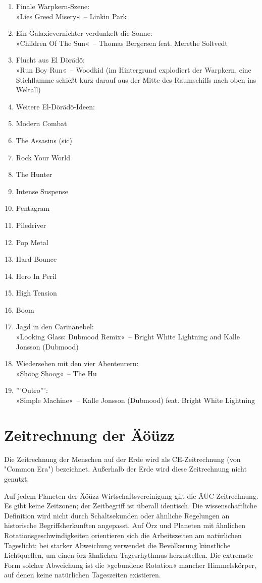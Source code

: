 \begin{enumerate}
    \item Finale Warpkern-Szene:\\ »Lies Greed Misery«~– Linkin Park
    \item Ein Galaxievernichter verdunkelt die Sonne:\\ »Children Of The Sun«~– Thomas Bergersen feat. Merethe Soltvedt
    \item Flucht aus El Dörädö:\\ »Run Boy Run«~– Woodkid                                      (im Hintergrund explodiert der Warpkern, eine Stichflamme schießt kurz darauf aus der Mitte des Raumschiffs nach oben ins Weltall)
    \item Weitere El-Dörädö-Ideen:
    \item Modern Combat
    \item The Assasins (sic)
    \item Rock Your World
    \item The Hunter
    \item Intense Suspense
    \item Pentagram
    \item Piledriver
    \item Pop Metal
    \item Hard Bounce
    \item Hero In Peril
    \item High Tension
    \item Boom
    \item Jagd in den Carinanebel:\\ »Looking Glass: Dubmood Remix«~– Bright White Lightning and Kalle Jonsson (Dubmood)
    \item Wiedersehen mit den vier Abenteurern:\\ »Shoog Shoog«~– The Hu
    \item '''Outro''':\\ »Simple Machine«~– Kalle Jonsson (Dubmood) feat. Bright White Lightning
\end{enumerate}

\chapter{Zeitrechnung der Äöüzz}

Die Zeitrechnung der Menschen auf der Erde wird als CE-Zeitrechnung (von "Common Era") bezeichnet. Außerhalb der Erde wird diese Zeitrechnung nicht genutzt.

Auf jedem Planeten der Äöüzz-Wirtschaftsvereinigung gilt die ÄÜC-Zeitrechnung. Es gibt keine Zeitzonen; der Zeitbegriff ist überall identisch. Die wissenschaftliche Definition wird nicht durch Schaltsekunden oder ähnliche Regelungen an historische Begriffsherkunften angepasst. Auf Örz und Planeten mit ähnlichen Rotationsgeschwindigkeiten orientieren sich die Arbeitszeiten am natürlichen Tageslicht; bei starker Abweichung verwendet die Bevölkerung künstliche Lichtquellen, um einen örz-ähnlichen Tagesrhythmus herzustellen. Die extremste Form solcher Abweichung ist die »gebundene Rotation« mancher Himmelskörper, auf denen keine natürlichen Tageszeiten existieren.

